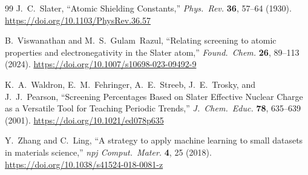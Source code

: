 \documentclass[11pt,a4paper]{article}
\begin{document}
\begin{thebibliography}{99}
J.~C.~Slater, ``Atomic Shielding Constants,'' \textit{Phys.\ Rev.} \textbf{36}, 57--64 (1930). \url{https://doi.org/10.1103/PhysRev.36.57}

B.~Viswanathan and M.~S.~Gulam~Razul, ``Relating screening to atomic properties and electronegativity in the Slater atom,'' \textit{Found.\ Chem.} \textbf{26}, 89--113 (2024). \url{https://doi.org/10.1007/s10698-023-09492-9}

K.~A.~Waldron, E.~M.~Fehringer, A.~E.~Streeb, J.~E.~Trosky, and J.~J.~Pearson, ``Screening Percentages Based on Slater Effective Nuclear Charge as a Versatile Tool for Teaching Periodic Trends,'' \textit{J.\ Chem.\ Educ.} \textbf{78}, 635--639 (2001). \url{https://doi.org/10.1021/ed078p635}

Y.~Zhang and C.~Ling, ``A strategy to apply machine learning to small datasets in materials science,'' \textit{npj Comput.\ Mater.} \textbf{4}, 25 (2018). \url{https://doi.org/10.1038/s41524-018-0081-z}

\end{thebibliography}
\end{document}
